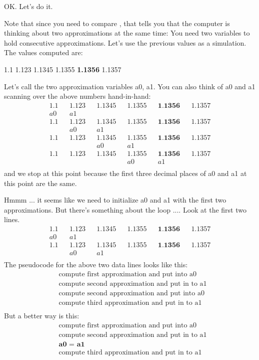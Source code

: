 OK. Let's do it.

Note that since you need to compare , that tells you that the computer is thinking about two
approximations at the same time: You need two variables to hold
consecutive approximations. Let's use the previous
values as a simulation. The values computed are:
\begin{center}
1.1 1.123 1.1345 1.1355 \textbf{1.1356} 1.1357
\end{center}
Let's call the two approximation variables a0, a1. You
can also think of a0 and a1 scanning over the above numbers
hand-in-hand:
\begin{align*}
1.1         &&1.123       &&1.1345      &&1.1355      &&\textbf{1.1356} &&1.1357 \\
a0         &&a1 \\
1.1         &&1.123       &&1.1345      &&1.1355      &&\textbf{1.1356} &&1.1357 \\
&&a0        &&a1 \\
1.1         &&1.123       &&1.1345      &&1.1355      &&\textbf{1.1356} &&1.1357 \\
&&&&a0       &&a1 \\
1.1         &&1.123       &&1.1345      &&1.1355      &&\textbf{1.1356} &&1.1357 \\
&&&&&&a0      &&a1 \\
\end{align*}
and we stop at this point because the first three decimal places of a0
and a1 at this point are the same.

Hmmm ... it seems like we need to initialize a0 and a1 with the first
two approximations. But there's something about the loop
.... Look at the first two lines.
\begin{align*}
1.1         &&1.123       &&1.1345      &&1.1355      &&\textbf{1.1356} &&1.1357 \\
a0         &&a1 \\
1.1         &&1.123       &&1.1345      &&1.1355      &&\textbf{1.1356} &&1.1357 \\
&&a0        &&a1 \\
\end{align*}
The pseudocode for the above two data lines looks like this:
\begin{align*}
&\text{compute first approximation and put into a0}\\
&\text{compute second approximation and put in to a1}\\
&\text{compute second approximation and put into a0}\\
&\text{compute third approximation and put in to a1}\\
\end{align*}
But a better way is this:
\begin{align*}
&\text{compute first approximation and put into a0}\\
&\text{compute second approximation and put in to a1}\\
&\textbf{a0 = a1}\\
&\text{compute third approximation and put in to a1}\\
\end{align*}

